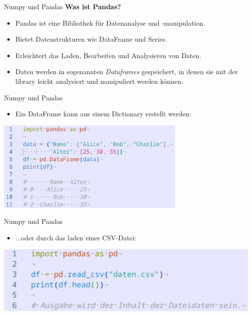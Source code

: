 \documentclass[aspectratio=169]{beamer}
\begin{document}
\begin{frame}{Numpy und Pandas}
    \textbf{Was ist Pandas?}
    \begin{itemize}
        \item Pandas ist eine Bibliothek für Datenanalyse und -manipulation.
        \item Bietet Datenstrukturen wie DataFrame und Series.
        \item Erleichtert das Laden, Bearbeiten und Analysieren von Daten.
        \pause
        \item Daten werden in sogenannten \textit{Dataframes} gespeichert, in denen sie mit der library leicht analysiert und manipuliert werden können.
    \end{itemize}
\end{frame}

\begin{frame}{Numpy und Pandas}
    \begin{itemize}
        \item Ein DataFrame kann aus einem Dictionary erstellt werden:
    \end{itemize}
    \begin{tcolorbox}[colframe=oxfordblue, colback=blue!10, coltitle=white, title=Python]
        \includegraphics[width=0.7\textwidth]{images/code_pandascreatedataframes.png}
    \end{tcolorbox}
\end{frame}

\begin{frame}{Numpy und Pandas}
    \begin{itemize}
        \item ...oder durch das laden einer CSV-Datei:
    \end{itemize}
    \begin{tcolorbox}[colframe=oxfordblue, colback=blue!10, coltitle=white, title=Python]
        \includegraphics[width=\textwidth]{images/code_pandasdatasetcsv.png}
    \end{tcolorbox}
\end{frame}
\end{document}
